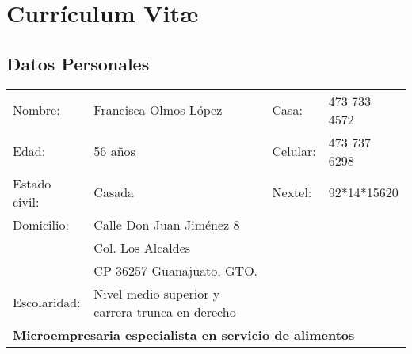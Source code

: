 \documentclass[12pt]{article}
\begin{document}
\newpage

\section{Currículum Vitæ}
\subsection*{Datos Personales}
\begin{tabular}{l l l l}
Nombre:			&	Francisca Olmos López	&	Casa:‭		&	473 ‬73‭‬3 4572\\
Edad‭:			& 	56‭ ‬años					&	Celular:	&	‬473‭ ‬73‭‬7 6298\\
Estado civil:	&	Casada					&	Nextel‭:		&	92‭*‬14‭*‬15620\\
Domicilio:		&	Calle Don Juan Jiménez ‬8‭&&\\
				&	Col. Los Alcaldes\\
				&	CP 36257 Guanajuato, GTO.&&\\
Escolaridad‭:‭	&	‬Nivel medio superior y carrera trunca en derecho &&\\
\multicolumn{4}{l}{\textbf{Microempresaria especialista en	servicio de alimentos}}
\end{tabular}
\end{document}
